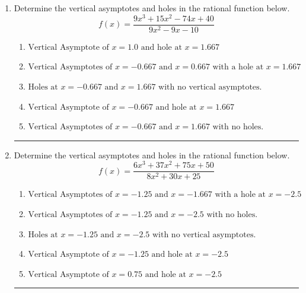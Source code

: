 \documentclass[14pt]{extbook}
\newcommand{\litem}[1]{\item#1\hspace*{-1cm}\rule{\textwidth}{0.4pt}}
\begin{document}
\begin{enumerate}
\litem{
Determine the vertical asymptotes and holes in the rational function below.\[ f(x) = \frac{9x^{3} +15 x^{2} -74 x + 40}{9x^{2} -9 x -10} \]\begin{enumerate}[label=\Alph*.]
\item \( \text{Vertical Asymptote of } x = 1.0 \text{ and hole at } x = 1.667 \)
\item \( \text{Vertical Asymptotes of } x = -0.667 \text{ and } x = 0.667 \text{ with a hole at } x = 1.667 \)
\item \( \text{Holes at } x = -0.667 \text{ and } x = 1.667 \text{ with no vertical asymptotes.} \)
\item \( \text{Vertical Asymptote of } x = -0.667 \text{ and hole at } x = 1.667 \)
\item \( \text{Vertical Asymptotes of } x = -0.667 \text{ and } x = 1.667 \text{ with no holes.} \)

\end{enumerate} }
\litem{
Determine the vertical asymptotes and holes in the rational function below.\[ f(x) = \frac{6x^{3} +37 x^{2} +75 x + 50}{8x^{2} +30 x + 25} \]\begin{enumerate}[label=\Alph*.]
\item \( \text{Vertical Asymptotes of } x = -1.25 \text{ and } x = -1.667 \text{ with a hole at } x = -2.5 \)
\item \( \text{Vertical Asymptotes of } x = -1.25 \text{ and } x = -2.5 \text{ with no holes.} \)
\item \( \text{Holes at } x = -1.25 \text{ and } x = -2.5 \text{ with no vertical asymptotes.} \)
\item \( \text{Vertical Asymptote of } x = -1.25 \text{ and hole at } x = -2.5 \)
\item \( \text{Vertical Asymptote of } x = 0.75 \text{ and hole at } x = -2.5 \)


\end{enumerate}}
\end{enumerate}
\end{document}
